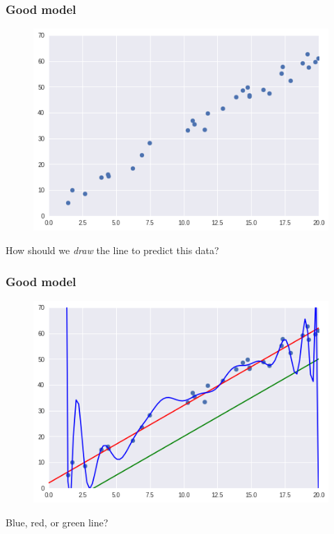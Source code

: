 \documentclass[]{beamer}
\begin{document}
\begin{frame}
\frametitle{Good model}
\begin{figure}
\includegraphics[scale=.4]{imgs/linreg_1.png}
\end{figure}
\begin{center}
How should we \textit{draw} the line to predict this data?
\end{center}
\end{frame}

\begin{frame}
\frametitle{Good model}
\begin{figure}
\includegraphics[scale=.4]{imgs/linreg_2.png}
\end{figure}
\begin{center}
Blue, red, or green line?
\end{center}
\end{frame}
\end{document}
